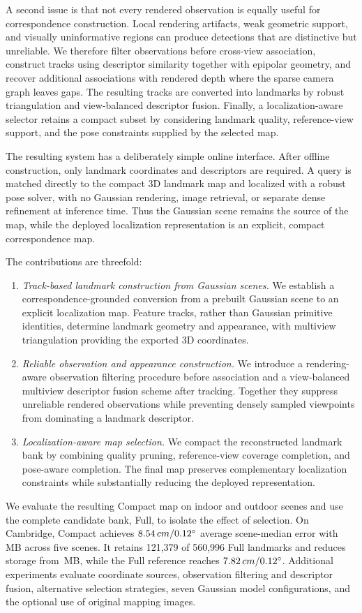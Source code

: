 A second issue is that not every rendered observation is equally useful for correspondence construction. Local rendering artifacts, weak geometric support, and visually uninformative regions can produce detections that are distinctive but unreliable. We therefore filter observations before cross-view association, construct tracks using descriptor similarity together with epipolar geometry, and recover additional associations with rendered depth where the sparse camera graph leaves gaps. The resulting tracks are converted into landmarks by robust triangulation and view-balanced descriptor fusion. Finally, a localization-aware selector retains a compact subset by considering landmark quality, reference-view support, and the pose constraints supplied by the selected map.

The resulting system has a deliberately simple online interface. After offline construction, only landmark coordinates and descriptors are required. A query is matched directly to the compact 3D landmark map and localized with a robust pose solver, with no Gaussian rendering, image retrieval, or separate dense refinement at inference time. Thus the Gaussian scene remains the source of the map, while the deployed localization representation is an explicit, compact correspondence map.

The contributions are threefold:
\begin{enumerate}
\item \textit{Track-based landmark construction from Gaussian scenes.} We establish a correspondence-grounded conversion from a prebuilt Gaussian scene to an explicit localization map. Feature tracks, rather than Gaussian primitive identities, determine landmark geometry and appearance, with multiview triangulation providing the exported 3D coordinates.
\item \textit{Reliable observation and appearance construction.} We introduce a rendering-aware observation filtering procedure before association and a view-balanced multiview descriptor fusion scheme after tracking. Together they suppress unreliable rendered observations while preventing densely sampled viewpoints from dominating a landmark descriptor.
\item \textit{Localization-aware map selection.} We compact the reconstructed landmark bank by combining quality pruning, reference-view coverage completion, and pose-aware completion. The final map preserves complementary localization constraints while substantially reducing the deployed representation.
\end{enumerate}

We evaluate the resulting Compact map on \numScenes{} indoor and outdoor scenes and use the complete candidate bank, Full, to isolate the effect of selection. On Cambridge, Compact achieves $8.54\,cm/0.12^\circ$ average scene-median error with \numCompactStorage{}\,MB across five scenes. It retains 121,379 of 560,996 Full landmarks and reduces storage from \numFullStorage{}\,MB, while the Full reference reaches $7.82\,cm/0.12^\circ$. Additional experiments evaluate coordinate sources, observation filtering and descriptor fusion, alternative selection strategies, seven Gaussian model configurations, and the optional use of original mapping images.